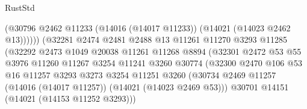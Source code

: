 \begin{lexlean}{RustStd}
\begin{coremodule}
                                            (@30796
                                              @2462
                                              @11233
                                              (@14016 (@14017 @11233))
                                              (@14021 (@14023 @2462 @13))))))
                                      (@32281
                                        @2474
                                        @2481
                                        @2488
                                        @13
                                        @11261
                                        @11270
                                        @3293
                                        @11285
                                        (@32292
                                          @2473
                                          @1049
                                          @20038
                                          @11261
                                          @11268
                                          @8894
                                          (@32301
                                            @2472
                                            @53
                                            @55
                                            @3976
                                            @11260
                                            @11267
                                            @3254
                                            @11241
                                            @3260
                                            @30774
                                            (@32300
                                              @2470
                                              @106
                                              @53
                                              @16
                                              @11257
                                              @3293
                                              @3273
                                              @3254
                                              @11251
                                              @3260
                                              (@30734
                                                @2469
                                                @11257
                                                (@14016 (@14017 @11257))
                                                (@14021 (@14023 @2469 @53)))
                                              @30701
                                              @14151
                                              (@14021 (@14153 @11252 @3293)))

\end{coremodule}
\end{lexlean}

